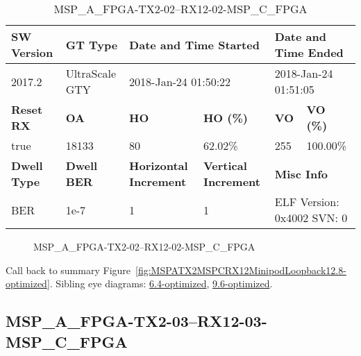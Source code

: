 \begin{table}[h]
\centering
\caption{MSP\_A\_FPGA-TX2-02--RX12-02-MSP\_C\_FPGA}
\label{tab:MSPAFPGATX202RX1202MSPCFPGA12.8-optimized}
\begin{tabular}{@{}|l|l|l|l|l|l|@{}}
\toprule
\textbf{SW Version}                & \textbf{GT Type}   & \multicolumn{2}{l|}{\textbf{Date and Time Started}}            & \multicolumn{2}{l|}{\textbf{Date and Time Ended}}        \\ \midrule
2017.2                       & UltraScale GTY          & \multicolumn{2}{l|}{2018-Jan-24 01:50:22}                   & \multicolumn{2}{l|}{2018-Jan-24 01:51:05}               \\ \midrule
\textbf{Reset RX}                  & \textbf{OA} & \textbf{HO}   & \textbf{HO (\%)} & \textbf{VO} & \textbf{VO (\%)} \\ \midrule
true & 18133        & 80          & 62.02\%        & 255        & 100.00\%       \\ \midrule
\textbf{Dwell Type}                & \textbf{Dwell BER} & \textbf{Horizontal Increment} & \textbf{Vertical Increment}    & \multicolumn{2}{l|}{\textbf{Misc Info}}                  \\ \midrule
BER                            & 1e-7        & 1        & 1           & \multicolumn{2}{l|}{ELF Version: 0x4002 SVN: 0}                         \\ \bottomrule
\end{tabular}
\end{table}

\begin{figure}[h]
\caption{MSP\_A\_FPGA-TX2-02--RX12-02-MSP\_C\_FPGA} \label{fig:MSPAFPGATX202RX1202MSPCFPGA12.8-optimized}
\end{figure}

Call back to summary Figure~\ref{fig:MSPATX2MSPCRX12MinipodLoopback12.8-optimized}.
Sibling eye diagrams: \hyperref[sec:MSPAFPGATX202RX1202MSPCFPGA6.4-optimized]{6.4-optimized}, \hyperref[sec:MSPAFPGATX202RX1202MSPCFPGA9.6-optimized]{9.6-optimized}.

\clearpage
\newpage


\subsection{MSP\_A\_FPGA-TX2-03--RX12-03-MSP\_C\_FPGA}\label{sec:MSPAFPGATX203RX1203MSPCFPGA12.8-optimized}

